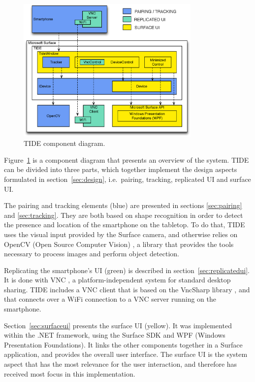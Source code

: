 \begin{figure}[htb]
  \centering
    \includegraphics[width=0.8\textwidth]{images/overviewNew}
    \caption{TIDE component diagram.}
    \label{fig:overview}
\end{figure}

Figure~\ref{fig:overview} is a component diagram that presents an overview of the system.
TIDE can be divided into three parts, which together implement the design aspects formulated in section~\ref{sec:design}, i.e.\ pairing, tracking, replicated UI and surface UI.

The pairing and tracking elements (blue) are presented in sections \ref{sec:pairing} and \ref{sec:tracking}.
They are both based on shape recognition in order to detect the presence and location of the smartphone on the tabletop.
To do that, TIDE uses the visual input provided by the Surface camera, and otherwise relies on OpenCV (Open Source Computer Vision) \citeyearpar{opencv}, a library that provides the tools necessary to process images and perform object detection.

Replicating the smartphone's UI (green) is described in section~\ref{sec:replicatedui}.
It is done with VNC \citep{Richardson:1998:vnc}, a platform-independent system for standard desktop sharing.
TIDE includes a VNC client that is based on the VncSharp library \citep{vncsharp}, and that connects over a WiFi connection to a VNC server running on the smartphone.

Section~\ref{sec:surfaceui} presents the surface UI (yellow).
It was implemented within the .NET framework, using the Surface SDK and WPF (Windows Presentation Foundations).
It links the other components together in a Surface application, and provides the overall user interface.
The surface UI is the system aspect that has the most relevance for the user interaction, and therefore has received most focus in this implementation.

